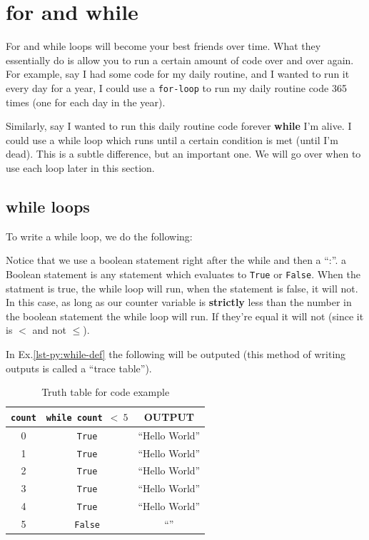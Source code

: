 \documentclass[12pt,a4paper]{book}
\begin{document}
		\section{for and while}
				For and while loops will become your best friends over time. What they essentially do is allow you to run a certain amount of code over and over again. For example, say I had some code for my daily routine, and I wanted to run it every day for a year, I could use a \texttt{for-loop} to run my daily routine code 365 times (one for each day in the year). 
				
				Similarly, say I wanted to run this daily routine code forever \textbf{while} I'm alive. I could use a while loop which runs until a certain condition is met (until I'm dead). This is a subtle difference, but an important one. We will go over when to use each loop later in this section.

				\subsection{while loops}
					To write a while loop, we do the following:
					
					Notice that we use a boolean statement right after the while and then a ``:''. a Boolean statement is any statement which evaluates to \texttt{True} or \texttt{False}. When the statment is true, the while loop will run, when the statement is false, it will not. In this case, as long as our counter variable is \textbf{strictly} less than the number in the boolean statement the while loop will run. If they're equal it will not (since it is $<$ and not $\leq$).
					
					In Ex.\ref{lst-py:while-def} the following will be outputed (this method of writing outputs is called a ``trace table'').
					\begin{table}[H]
						\centering
						\begin{tabular}{c|c|c}
							\texttt{count} & \texttt{while count $< \ 5$} & OUTPUT \\
							\hline
							0 & \texttt{True} & ``Hello World'' \\
							1 & \texttt{True} & ``Hello World'' \\
							2 & \texttt{True} & ``Hello World'' \\
							3 & \texttt{True} & ``Hello World'' \\
							4 & \texttt{True} & ``Hello World'' \\
							5 & \texttt{False} & ``''
						\end{tabular}
						\caption{Truth table for code example}
						\label{tab:while-def-tt}
					\end{table}
\end{document}
